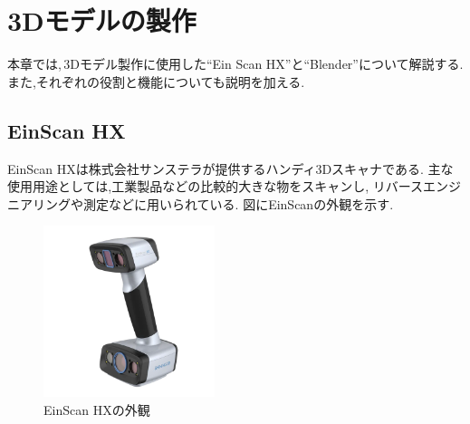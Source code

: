 \documentclass{ltjsreport}
\begin{document}
\chapter{3Dモデルの製作}
	本章では,\,3Dモデル製作に使用した``Ein Scan HX''と``Blender''について解説する.
	また,それぞれの役割と機能についても説明を加える.

	\section{EinScan HX}
		EinScan HX\cite{ref:5}は株式会社サンステラが提供するハンディ3Dスキャナである.
		主な使用用途としては,工業製品などの比較的大きな物をスキャンし,
		リバースエンジニアリングや測定などに用いられている.
		図にEinScanの外観を示す.

		\begin{figure}[H]
		\centering
		\includegraphics[width = 5cm]{../figs/EinScan.png}
		\hspace{-32truemm}
		\caption{EinScan HXの外観}
		\label{fig:EinScan}
		\end{figure}
\vspace{-15pt}
\end{document}
